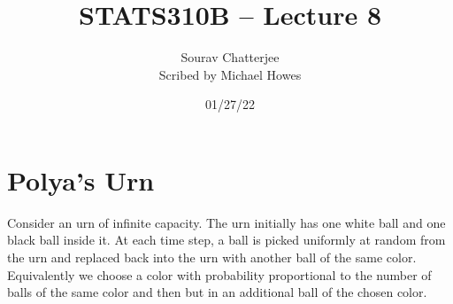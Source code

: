 




\title{STATS310B -- Lecture 8}
\author{Sourav Chatterjee\\ Scribed by Michael Howes}
\date{01/27/22}

\pagestyle{fancy}
\fancyhf{}


\maketitle
\tableofcontents
\section{Polya's Urn}
Consider an urn of infinite capacity. The urn initially has one white ball and one black ball inside it. At each time step, a ball is picked uniformly at random from the urn and replaced back into the urn with another ball of the same color. Equivalently we choose a color with probability proportional to the number of balls of the same color and then but in an additional ball of the chosen color. 

